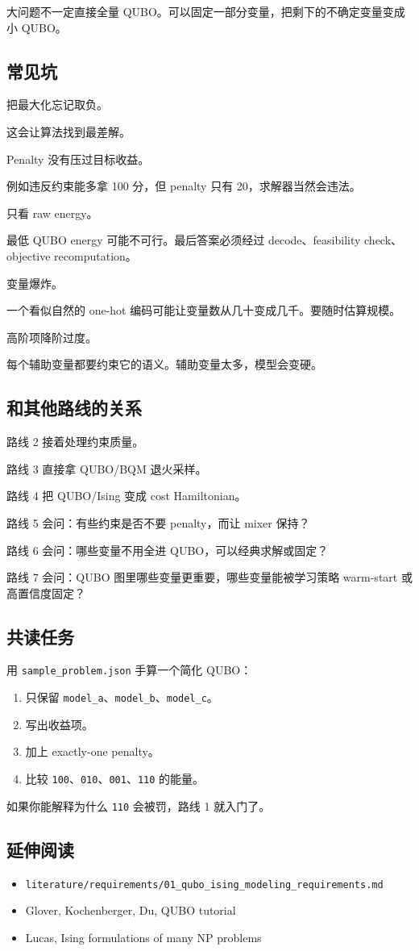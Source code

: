 \documentclass[UTF8,12pt,a4paper]{ctexart}
\begin{document}
大问题不一定直接全量 QUBO。可以固定一部分变量，把剩下的不确定变量变成小 QUBO。

\subsection*{常见坑}

把最大化忘记取负。

这会让算法找到最差解。

Penalty 没有压过目标收益。

例如违反约束能多拿 100 分，但 penalty 只有 20，求解器当然会违法。

只看 raw energy。

最低 QUBO energy 可能不可行。最后答案必须经过 decode、feasibility check、objective recomputation。

变量爆炸。

一个看似自然的 one-hot 编码可能让变量数从几十变成几千。要随时估算规模。

高阶项降阶过度。

每个辅助变量都要约束它的语义。辅助变量太多，模型会变硬。

\subsection*{和其他路线的关系}

路线 2 接着处理约束质量。

路线 3 直接拿 QUBO/BQM 退火采样。

路线 4 把 QUBO/Ising 变成 cost Hamiltonian。

路线 5 会问：有些约束是否不要 penalty，而让 mixer 保持？

路线 6 会问：哪些变量不用全进 QUBO，可以经典求解或固定？

路线 7 会问：QUBO 图里哪些变量更重要，哪些变量能被学习策略 warm-start 或高置信度固定？

\subsection*{共读任务}

用 \texttt{sample\_problem.json} 手算一个简化 QUBO：

\begin{enumerate}
\item 只保留 \texttt{model\_a}、\texttt{model\_b}、\texttt{model\_c}。
\item 写出收益项。
\item 加上 exactly-one penalty。
\item 比较 \texttt{100}、\texttt{010}、\texttt{001}、\texttt{110} 的能量。
\end{enumerate}

如果你能解释为什么 \texttt{110} 会被罚，路线 1 就入门了。

\subsection*{延伸阅读}

\begin{itemize}
\item \texttt{literature/requirements/01\_qubo\_ising\_modeling\_requirements.md}
\item Glover, Kochenberger, Du, QUBO tutorial
\item Lucas, Ising formulations of many NP problems
\end{itemize}
\end{document}
